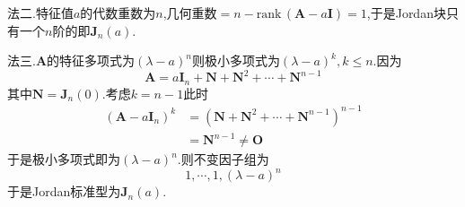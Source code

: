 \begin{brown}
\begin{solution}
        法二.特征值$a$的代数重数为$n$,几何重数$=n-\mathrm{rank}\,\left(
            \bm{A}-a\bm{I}
        \right)=1$,于是\textup{Jordan}块只有一个$n$阶的即$\bm{J}_n\left(a\right)$.

        法三.$\bm{A}$的特征多项式为$\left(
            \lambda-a
        \right)^n$则极小多项式为$\left(
            \lambda-a
        \right)^k,k\leqslant n.$因为\[
        \bm{A}=a\bm{I}_n+\bm{N}+\bm{N}^2+\cdots+\bm{N}^{n-1}
        \]其中$\bm{N}=\bm{J}_n\left(0\right).$考虑$k=n-1$此时\begin{align*}
            \left(
                \bm{A}-a\bm{I}_n
            \right)^k&=\left(
                \bm{N}+\bm{N}^2+\cdots+\bm{N}^{n-1}
            \right)^{n-1}\\
            &=\bm{N}^{n-1}\neq \bm{O}
        \end{align*}于是极小多项式即为$\left(
            \lambda-a
            \right)^n$.则不变因子组为\[
            1,\cdots,1,\left(\lambda-a\right)^n\]于是\textup{Jordan}标准型为$\bm{J}_n\left(a\right)$.
    \end{solution}
\end{brown}
